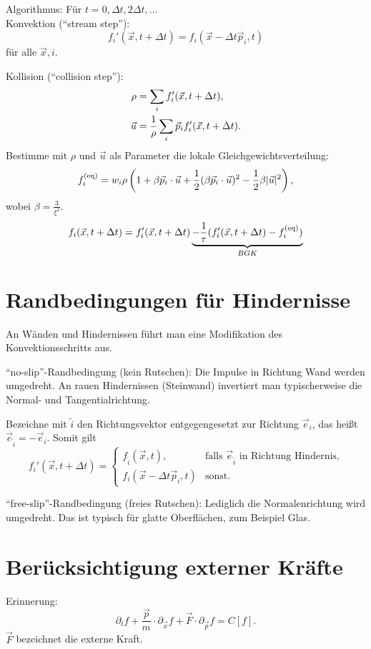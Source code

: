 Algorithmus: Für $t = 0, \Delta t, 2 \Delta t, \ldots$ \\
Konvektion (``stream step''):
\[ f_i'(\vec{x}, t + \Delta t) = f_i( \vec{x} - \Delta t \vec{p}_i, t) \]
für alle $\vec{x}, i$.

Kollision (``collision step''):
\begin{align*}
  \rho &= \sum_i f_i'(\vec{x}, t + \Delta t), \\
  \vec{u} &= \frac{1}{\rho} \sum_i \vec{p}_i f_i'(\vec{x}, t + \Delta t).
\end{align*}
Bestimme mit $\rho$ und $\vec{u}$ als Parameter die lokale
Gleichgewichtsverteilung:
\[ f_i^{(\text{eq})} = w_i \rho \left( 1 + \beta \vec{p}_i \cdot \vec{u}
    + \frac{1}{2} (\beta \vec{p}_i \cdot \vec{u})^2
    - \frac{1}{2} \beta |\vec{u}|^2 \right), \]
wobei $\beta = \frac{3}{\xi^2}$.
\[ f_i( \vec{x}, t + \Delta t ) = f_i'(\vec{x}, t + \Delta t )
\underbrace{- \frac{1}{\tau} (f_i'(\vec{x},t+\Delta t) - f_i^{(\text{eq})})}_{BGK}\]

\section{Randbedingungen für Hindernisse}
An Wänden und Hindernissen führt man eine Modifikation des Konvektionsschritts
aus.

``no-slip''-Randbedingung (kein Rutschen): Die Impulse in Richtung Wand
werden umgedreht. An rauen Hindernissen (Steinwand) invertiert man
typischerweise die Normal- und Tangentialrichtung.

Bezeichne mit $\tilde{i}$ den Richtungsvektor entgegengesetzt zur Richtung
$\vec{e}_i$, das heißt $\vec{e}_{\tilde{i}} = - \vec{e}_i$. Somit gilt
\[ f_i'(\vec{x}, t + \Delta t) =
  \begin{cases}
    f_{\tilde{i}}(\vec{x}, t), & \text{falls $\vec{e}_{\tilde{i}}$ in Richtung
      Hindernis,} \\
    f_i(\vec{x} - \Delta t \vec{p}_i, t) &\text{sonst.}
  \end{cases}
\]

``free-slip''-Randbedingung (freies Rutschen): Lediglich die Normalenrichtung
wird umgedreht. Das ist typisch für glatte Oberflächen, zum Beispiel Glas.


\section*{Berücksichtigung externer Kräfte}
Erinnerung:
\[ \partial_t f + \frac{\vec{p}}{m} \cdot \partial_{\vec{x}} f
  + \vec{F} \cdot \partial_{\vec{p}} f = C[f]. \]
$\vec{F}$ bezeichnet die externe Kraft.

